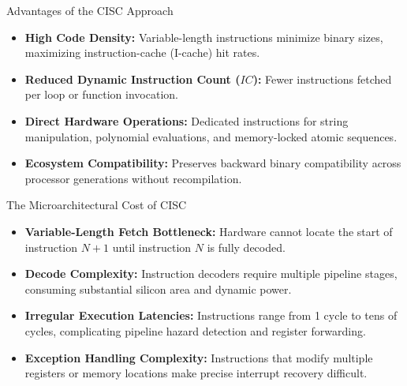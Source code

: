 \documentclass[aspectratio=169,11pt,t]{beamer}
\newcommand{\key}[1]{\textbf{#1}}
\begin{document}
\begin{frame}{Advantages of the CISC Approach}
\large
\begin{itemize}\setlength{\itemsep}{8pt}
  \item \key{High Code Density:} Variable-length instructions minimize binary sizes, maximizing instruction-cache (I-cache) hit rates.
  \item \key{Reduced Dynamic Instruction Count ($\mathit{IC}$):} Fewer instructions fetched per loop or function invocation.
  \item \key{Direct Hardware Operations:} Dedicated instructions for string manipulation, polynomial evaluations, and memory-locked atomic sequences.
  \item \key{Ecosystem Compatibility:} Preserves backward binary compatibility across processor generations without recompilation.
\end{itemize}
\end{frame}


\begin{frame}{The Microarchitectural Cost of CISC}
\large
\begin{itemize}\setlength{\itemsep}{8pt}
  \item \key{Variable-Length Fetch Bottleneck:} Hardware cannot locate the start of instruction $N+1$ until instruction $N$ is fully decoded.
  \item \key{Decode Complexity:} Instruction decoders require multiple pipeline stages, consuming substantial silicon area and dynamic power.
  \item \key{Irregular Execution Latencies:} Instructions range from 1 cycle to tens of cycles, complicating pipeline hazard detection and register forwarding.
  \item \key{Exception Handling Complexity:} Instructions that modify multiple registers or memory locations make precise interrupt recovery difficult.
\end{itemize}
\end{frame}

\end{document}
